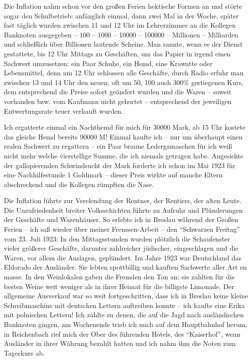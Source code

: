 \documentclass[a5paper,pagesize,10pt,twoside=true]{scrbook}
\begin{document}
Die Inflation nahm schon vor den großen Ferien hektische Formen an und störte sogar den Schulbetrieb: anfänglich einmal, dann zwei Mal in der Woche, später fast täglich wurden zwischen 11 und 12 Uhr im Lehrerzimmer an die Kollegen Banknoten ausgegeben -- \num{100} -- \num{1000} -- \num{10000} -- \num{100000} -- Millionen -- Milliarden und schließlich über Billionen lautende Scheine. Man rannte, wenn es der Dienst gestattete, bis 12 Uhr Mittags zu Geschäften, um das Papier in irgend einen Sachwert umzusetzen: ein Paar Schuhe, ein Hemd, eine Krawatte oder Lebensmittel, denn um 12 Uhr schlossen alle Geschäfte, durch Radio erfuhr man zwischen 13 und 14 Uhr den neuen, oft um 50, 100 auch 300\% gestiegenen Kurs, dem entsprechend die Preise sofort geändert wurden und die Waren -- soweit vorhanden bzw. vom Kaufmann nicht gehortet -- entsprechend der jeweiligen Entwertungsrate teuer verkauft wurden.

Ich ergatterte einmal ein Nachthemd für mich für \num{30000} Mark, ab 15 Uhr kostete das gleiche Hemd bereits \num{90000} M! Einmal kaufte ich -- nur um überhaupt einen realen Sachwert zu ergattern -- ein Paar braune Ledergamaschen für ich weiß nicht mehr welche vierstellige Summe, die ich niemals getragen habe. Angesichts der gallopierenden Schwindsucht der Mark forderte ich schon im Mai 1923 für eine Nachhilfestunde 1 Goldmark -- dieser Preis wirkte auf manche Eltern abschreckend und die Kollegen rümpften die Nase.

Die Inflation führte zur Verelendung der Rentner, der Rentiers, der alten Leute. Die Unzufriedenheit breiter Volksschichten führte zu Aufruhr und Plünderungen der Geschäfte und Warenhäuser. So erlebte ich in Breslau während der Großen Ferien -- ich saß wieder über meiner Frenssen-Arbeit -- den \enquote{Schwarzen Freitag} vom 23. Juli 1923: In den Mittagsstunden wurden plötzlich die Schaufenster vieler größerer Geschäfte, darunter zahlreicher jüdischer, eingeschlagen und die Waren, vor allem die Auslagen, geplündert. Im Jahre 1923 war Deutschland das Eldorado der Ausländer. Sie lebten spottbillig und kauften Sachwerte aller Art en masse. In den Weinlokalen gaben die Fremden den Ton an: sie zahlten für die besten Weine weit weniger als in ihrer Heimat für die billigste Limonade. Der allgemeine Ausverkauf war so weit fortgeschritten, dass ich in Breslau keine kleine Schreibmaschine mit deutschen Lettern auftreiben konnte -- ich kaufte eine Erika mit polnischen Lettern! Ich zählte zu denen, die auf die Jagd nach ausländischen Banknoten gingen, am Wochenende trieb ich mich auf dem Hauptbahnhof herum, in Reichenbach rief mich der Ober des führenden Hotels, des \enquote{Kaiserhof}, wenn Ausländer in ihrer Währung bezahlt hatten und ich nahm ihm die Noten zum Tageskurs ab.
\end{document}
